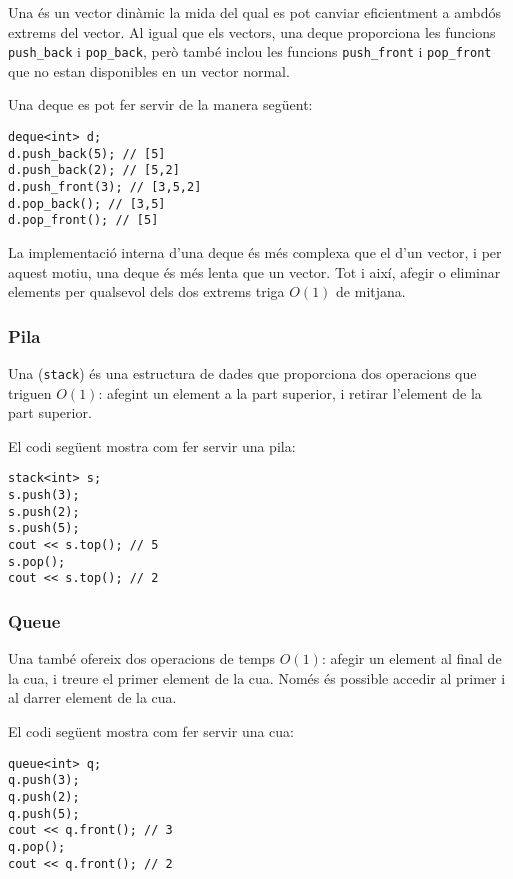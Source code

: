 
Una  és un vector dinàmic
la mida del qual es pot canviar eficientment
a ambdós extrems del vector.
Al igual que els vectors, una deque proporciona les funcions
\texttt{push\_back} i \texttt{pop\_back}, però
també inclou les funcions
\texttt{push\_front} i \texttt{pop\_front}
que no estan disponibles en un vector normal.

Una deque es pot fer servir de la manera següent:
\begin{lstlisting}
deque<int> d;
d.push_back(5); // [5]
d.push_back(2); // [5,2]
d.push_front(3); // [3,5,2]
d.pop_back(); // [3,5]
d.pop_front(); // [5]
\end{lstlisting}

La implementació interna d'una deque
és més complexa que el d'un vector,
i per aquest motiu, una deque és més lenta que un vector.
Tot i així, afegir o eliminar
elements per qualsevol dels dos extrems triga $O(1)$ de mitjana.

\subsubsection{Pila}


Una  (\texttt{stack})
és una estructura de dades que proporciona dos
operacions que triguen $O(1)$:
afegint un element a la part superior,
i retirar l'element de la part superior.

El codi següent mostra com fer servir una pila:
\begin{lstlisting}
stack<int> s;
s.push(3);
s.push(2);
s.push(5);
cout << s.top(); // 5
s.pop();
cout << s.top(); // 2
\end{lstlisting}

\subsubsection{Queue}


Una  també
ofereix dos operacions de temps $O(1)$:
afegir un element al final de la cua,
i treure el primer element de la cua.
Només és possible accedir al primer i al darrer element de la cua.

El codi següent mostra com fer servir una cua:
\begin{lstlisting}
queue<int> q;
q.push(3);
q.push(2);
q.push(5);
cout << q.front(); // 3
q.pop();
cout << q.front(); // 2
\end{lstlisting}


